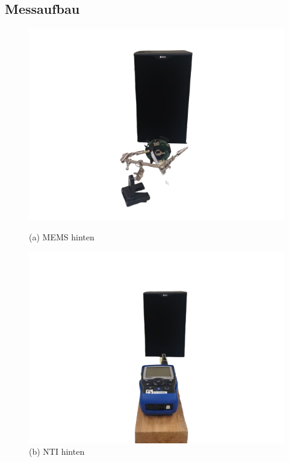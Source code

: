 \documentclass[12pt]{article}
\begin{document}
	\subsection{Messaufbau} \label{Messaufbau}
		\begin{figure}[H] 
			\centering 
			\begin{minipage}
				{0.45\textwidth} 		\includegraphics[width=\linewidth]{MEMS_Hinten-removebg} \caption*{(a) MEMS hinten} 
			\end{minipage} 
			\hfill 
			\begin{minipage}
				{0.45\textwidth} \includegraphics[width=\linewidth]{NTI_Hinten-removebg} \caption*{(b) NTI hinten} 
			\end{minipage} 

\end{figure}
\end{document}
